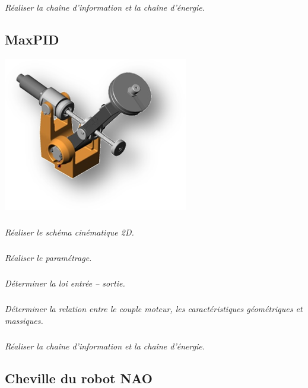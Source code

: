 \documentclass[10pt,fleqn]{article} %
\begin{document}
\begin{multicols}{2}
\subparagraph{}
\textit{Réaliser la chaîne d'information et la chaîne d'énergie.}


\subsection*{MaxPID}


\setcounter{exo}{0}
\begin{center}
\includegraphics[width=\linewidth]{images/maxpid_01}
\end{center}

\subparagraph{}
\textit{Réaliser le schéma cinématique 2D.}

\subparagraph{}
\textit{Réaliser le paramétrage.}


\subparagraph{}
\textit{Déterminer la loi entrée -- sortie.}

\subparagraph{}
\textit{Déterminer la relation entre le couple moteur, les caractéristiques géométriques et massiques. }


\subparagraph{}
\textit{Réaliser la chaîne d'information et la chaîne d'énergie.}

\subsection*{Cheville du robot NAO}



\end{multicols}
\end{document}
